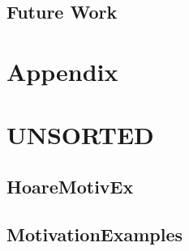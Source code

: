 \section{Future Work}


\chapter{Appendix}


\chapter{UNSORTED}

\section{HoareMotivEx}
\label{sec:hoaremotivex}


\section{MotivationExamples}
\label{sec:motivationexamples}

